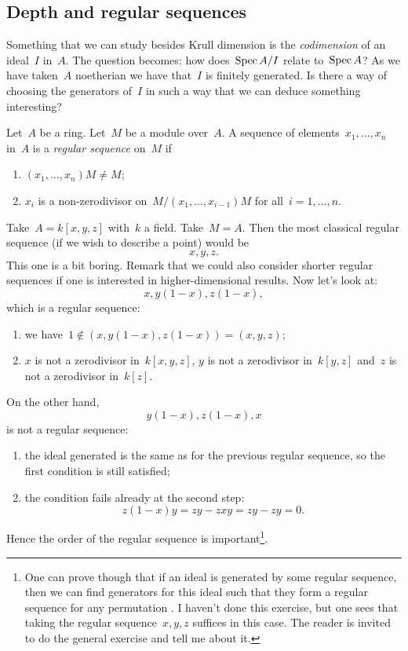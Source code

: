 \documentclass[10pt,a4paper]{article}
\begin{document}
\subsection{Depth and regular sequences}
Something that we can study besides Krull dimension is the \emph{codimension} of an ideal~$I$ in~$A$. The question becomes: how does~$\operatorname{Spec} A/I$ relate to~$\operatorname{Spec} A$? As we have taken~$A$ noetherian we have that~$I$ is finitely generated. Is there a way of choosing the generators of~$I$ in such a way that we can deduce something interesting?
\begin{definition}
  Let~$A$ be a ring. Let~$M$ be a module over~$A$. A sequence of elements~$x_1,\dotsc,x_n$ in~$A$ is a \emph{regular sequence} on~$M$ if
  \begin{enumerate}
    \item $(x_1,\dotsc,x_n)M\neq M$;
    \item $x_i$ is a non-zerodivisor on~$M/(x_1,\dotsc,x_{i-1})M$ for all~$i=1,\dotsc,n$.
  \end{enumerate}
\end{definition}
\begin{example}
  Take~$A=k[x,y,z]$ with~$k$ a field. Take~$M=A$. Then the most classical regular sequence (if we wish to describe a point) would be
  \begin{equation}
    x,y,z.
  \end{equation}
  This one is a bit boring. Remark that we could also consider shorter regular sequences if one is interested in higher-dimensional results. Now let's look at:
  \begin{equation}
    x,y(1-x),z(1-x),
  \end{equation}
  which is a regular sequence:
  \begin{enumerate}
    \item we have~$1\notin(x,y(1-x),z(1-x))=(x,y,z)$;
    \item $x$ is not a zerodivisor in~$k[x,y,z]$, $y$ is not a zerodivisor in~$k[y,z]$ and~$z$ is not a zerodivisor in~$k[z]$.
  \end{enumerate}
  On the other hand,
  \begin{equation}
    y(1-x),z(1-x),x
  \end{equation}
  is not a regular sequence:
  \begin{enumerate}
    \item the ideal generated is the same as for the previous regular sequence, so the first condition is still satisfied;
    \item the condition fails already at the second step:
      \begin{equation}
        z(1-x)y=zy-zxy=zy-zy=0.
      \end{equation}
  \end{enumerate}
  Hence the order of the regular sequence is important\footnote{One can prove though that if an ideal is generated by some regular sequence, then we can find generators for this ideal such that they form a regular sequence for any permutation \cite[exercise 17.6]{eisenbud-commutative-algebra}. I haven't done this exercise, but one sees that taking the regular sequence~$x,y,z$ suffices in this case. The reader is invited to do the general exercise and tell me about it.}.
\end{example}
\end{document}
